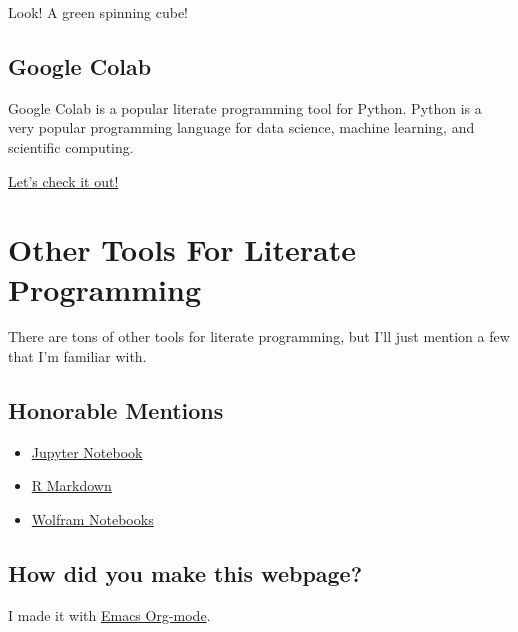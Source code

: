 \documentclass[11pt]{article}
\begin{document}
Look! A green spinning cube!

\subsection*{Google Colab}
\label{sec:org31b2962}

Google Colab is a popular literate programming tool for Python. Python is a very
popular programming language for data science, machine learning, and scientific
computing.

\href{https://colab.research.google.com/drive/1YUYT90gJIZ09V0YqueZnsBj2yGdYIXp0?usp=sharing}{Let's check it out!}

\section*{Other Tools For Literate Programming}
\label{sec:org9a098dc}

There are tons of other tools for literate programming, but I'll just mention a
few that I'm familiar with.

\subsection*{Honorable Mentions}
\label{sec:org06b8bda}

\begin{itemize}
\item \href{https://jupyter.org/}{Jupyter Notebook}
\item \href{https://rmarkdown.rstudio.com/}{R Markdown}
\item \href{https://www.wolfram.com/notebooks/}{Wolfram Notebooks}
\end{itemize}

\subsection*{How did you make this webpage?}
\label{sec:org8ca39e1}

I made it with \href{https://orgmode.org/}{Emacs Org-mode}.
\end{document}
